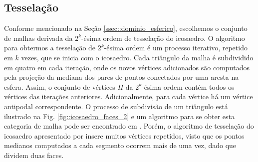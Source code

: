 

\subsection{Tesselação}
\label{ssec:tesselacao}


Conforme mencionado na Seção \ref{ssec::dominio_esferico}, escolhemos o conjunto de malhas derivada da $2^k$-ésima ordem de tesselação do icosaedro. O algoritmo para obtermos a tesselação de $2^k$-ésima ordem é um processo iterativo, repetido em $k$ vezes, que se inicia com o icosaedro. Cada triângulo da malha é subdividido em quatro em cada iteração, onde os novos vértices adicionados são computados pela projeção da mediana dos pares de pontos conectados por uma aresta na esfera. Assim, o conjunto de vértices $\Pi$ da $2^k$-ésima ordem contém todos os vértices das iterações anteriores. Adicionalmente, para cada vértice há um vértice antipodal correspondente. O processo de subdivisão de um triângulo está ilustrado na Fig. \ref{fig::icosaedro_faces_2} e um algoritmo para se obter esta categoria de malha pode ser encontrado em . Porém, o algoritmo de tesselação do icosaedro apresentado por  insere muitos vértices repetidos, visto que os pontos medianos computados a cada segmento ocorrem mais de uma vez, dado que dividem duas faces.

